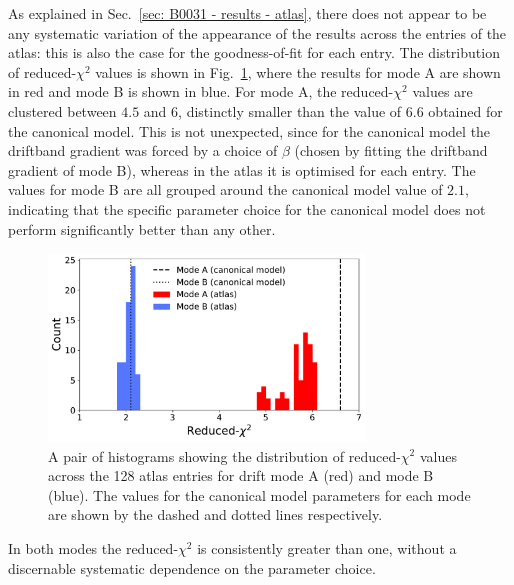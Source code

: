 As explained in Sec.~\ref{sec: B0031 - results - atlas}, there does not appear to be any systematic variation of the appearance of the results across the entries of the atlas: this is also the case for the goodness-of-fit for each entry. The distribution of reduced-$\chi^2$ values is shown in Fig.~\ref{fig: B0031 - atlas chi2}, where the results for mode A are shown in red and mode B is shown in blue. For mode A, the reduced-$\chi^2$ values are clustered between $4.5$ and $6$, distinctly smaller than the value of $6.6$ obtained for the canonical model. This is not unexpected, since for the canonical model the driftband gradient was forced by a choice of $\beta$ (chosen by fitting the driftband gradient of mode B), whereas in the atlas it is optimised for each entry. The values for mode B are all grouped around the canonical model value of $2.1$, indicating that the specific parameter choice for the canonical model does not perform significantly better than any other. 
\begin{figure}
    \begin{center}
        \includegraphics[width=0.75\textwidth]{Figures/B0031/atlas_chi2_hist}
        \caption[Distribution of the goodness-of-fit of the atlas results]{A pair of histograms showing the distribution of reduced-$\chi^2$ values across the 128 atlas entries for drift mode A (red) and mode B (blue). The values for the canonical model parameters for each mode are shown by the dashed and dotted lines respectively.}
        \label{fig: B0031 - atlas chi2}
    \end{center}
\end{figure}
In both modes the reduced-$\chi^2$ is consistently greater than one, without a discernable systematic dependence on the parameter choice. %

